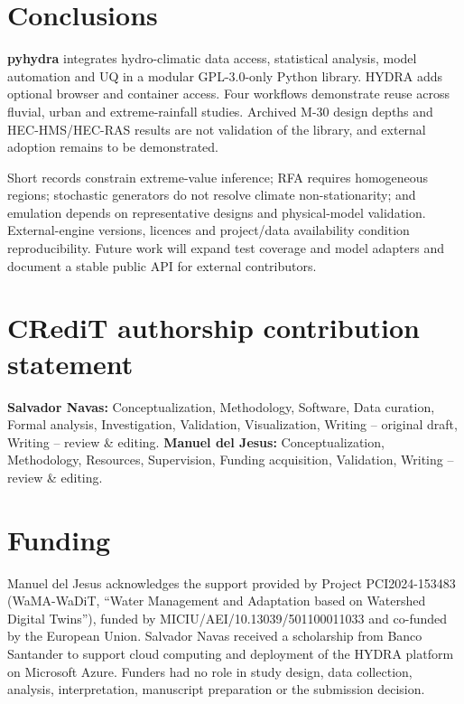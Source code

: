 \documentclass[preprint,12pt,a4paper]{elsarticle}
\newcommand{\pyhydra}{\textbf{pyhydra}}
\begin{document}
\section{Conclusions}
\label{sec:conclusions}

\pyhydra{} integrates hydro-climatic data access, statistical analysis,
model automation and UQ in a modular GPL-3.0-only Python library. HYDRA adds
optional browser and container access. Four workflows demonstrate reuse
across fluvial, urban and extreme-rainfall studies. Archived M-30 design
depths and HEC-HMS/HEC-RAS results are not validation of the library, and
external adoption remains to be demonstrated.

Short records constrain extreme-value inference; RFA requires homogeneous
regions; stochastic generators do not resolve climate non-stationarity;
and emulation depends on representative designs and physical-model
validation. External-engine versions, licences and project/data availability
condition reproducibility. Future work will expand test coverage and model
adapters and document a stable public API for external contributors.

\par\medskip
\begin{minipage}{\linewidth}
\section*{CRediT authorship contribution statement}
\textbf{Salvador Navas:} Conceptualization, Methodology, Software, Data
curation, Formal analysis, Investigation, Validation, Visualization, Writing
-- original draft, Writing -- review \& editing. \textbf{Manuel del Jesus:}
Conceptualization, Methodology, Resources, Supervision, Funding acquisition,
Validation, Writing -- review \& editing.

\end{minipage}

\section*{Funding}
Manuel del Jesus acknowledges the support provided by Project PCI2024-153483
(WaMA-WaDiT,
``Water Management and Adaptation based on Watershed Digital Twins''), funded
by MICIU/AEI/10.13039/501100011033 and co-funded by the European Union.
Salvador Navas received a scholarship from Banco Santander to support
cloud computing and deployment of the HYDRA platform on Microsoft Azure. Funders had
no role in study design, data collection, analysis, interpretation,
manuscript preparation or the submission decision.
\end{document}
